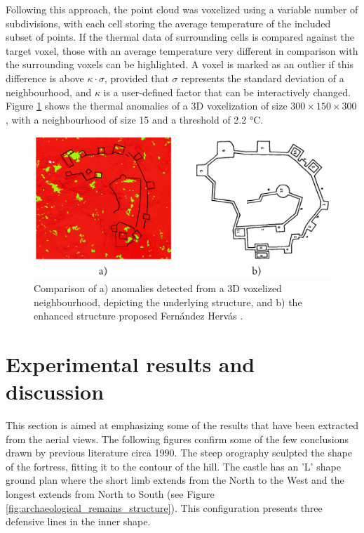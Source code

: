 Following this approach, the point cloud was voxelized using a variable number of subdivisions, with each cell storing the average temperature of the included subset of points. If the thermal data of surrounding cells is compared against the target voxel, those with an average temperature very different in comparison with the surrounding voxels can be highlighted. A voxel is marked as an outlier if this difference is above $\kappa \cdot \sigma$, provided that $\sigma$ represents the standard deviation of a neighbourhood, and $\kappa$ is a user-defined factor that can be interactively changed. Figure \ref{fig:voxel_anomalies} shows the thermal anomalies of a 3D voxelization of size $300 \times 150 \times 300$, with a neighbourhood of size 15 and a threshold of 2.2 \si{\celsius}.

\begin{figure}[ht]
    \centering
    \includegraphics[width=\linewidth]{figs/castle_puerta_arenas/voxel_anomalies_highlighted.png}
	\caption{Comparison of a) anomalies detected from a 3D voxelized neighbourhood, depicting the underlying structure, and b) the enhanced structure proposed Fernández Hervás \cite{fernandez_hervas_castillo_1986}.}
	\label{fig:voxel_anomalies}
\end{figure}


\section{Experimental results and discussion}

This section is aimed at emphasizing some of the results that have been extracted from the aerial views. The following figures confirm some of the few conclusions drawn by previous literature circa 1990. The steep orography sculpted the shape of the fortress, fitting it to the contour of the hill. The castle has an 'L' shape ground plan where the short limb extends from the North to the West and the longest extends from North to South (see Figure \ref{fig:archaeological_remains_structure}). This configuration presents three defensive lines in the inner shape. 

